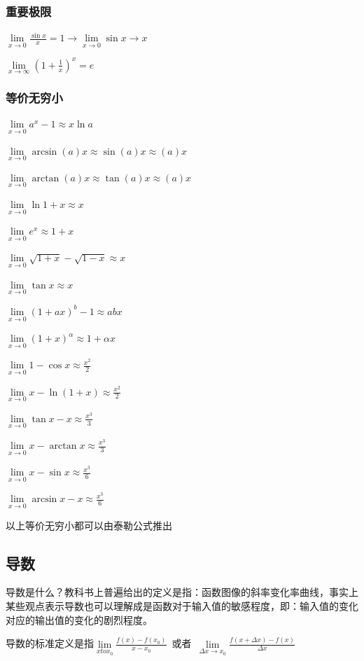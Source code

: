 \documentclass[UTF8]{ctexbook}
\newcommand{\limNormal}[1]{\lim\limits_{#1}}
\newcommand{\myLimToZero}{\limNormal{x \to 0}}
\newcommand{\myLimToInf}{\limNormal{x \to \infty}}
\begin{document}
{{{  \subsubsection{重要极限}{
    $\myLimToZero\frac{\sin{x}}{x}=1 \to \limNormal{x \to 0}\sin{x} \to x$

    $\myLimToInf(1+\frac{1}{x})^x = e$
  }%

  \subsubsection{等价无穷小}{
    $\myLimToZero a^x - 1 \approx x\ln{a}$

    $\myLimToZero \arcsin(a)x \approx \sin(a)x \approx (a)x$

    $\myLimToZero \arctan(a)x \approx \tan(a)x \approx (a)x$

    $\myLimToZero \ln1+x \approx x$

    $\myLimToZero e^x \approx 1+x$

    $\myLimToZero \sqrt{1 + x} - \sqrt{1 - x} \approx x$

    $\myLimToZero \tan{x} \approx x$

    $\myLimToZero (1 + ax)^b - 1 \approx abx$

    $\myLimToZero (1+x)^\alpha \approx 1+\alpha x$

    $\myLimToZero 1 - \cos x \approx \frac{x^2}{2}$

    $\myLimToZero x - \ln(1 + x) \approx \frac{x^2}{2}$

    $\myLimToZero \tan x - x \approx \frac{x^3}{3}$

    $\myLimToZero x - \arctan x \approx \frac{x^3}{3}$

    $\myLimToZero x - \sin x \approx \frac{x^3}{6}$

    $\myLimToZero \arcsin x - x \approx \frac{x^3}{6}$

    以上等价无穷小都可以由泰勒公式推出
  }%

}%

\subsection{导数}{
  导数是什么？教科书上普遍给出的定义是指：函数图像的斜率变化率曲线，事实上某些观点表示导数也可以理解成是函数对于输入值的敏感程度，即：输入值的变化对应的输出值的变化的剧烈程度。

  导数的标准定义是指$\limNormal{x to x_0}\frac{f(x) - f(x_0)}{x - x_0}$\ 或者\ $\limNormal{\Delta x \to x_0}\frac{f(x + \Delta x) - f(x)}{\Delta x}$

}}}
\end{document}
